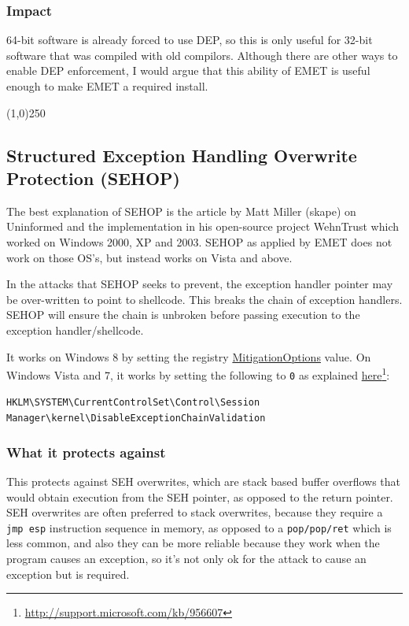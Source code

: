 \documentclass[]{article}
\newcommand{\fhref}[2]{\href{#1}{#2}\footnote{\url{#1}}}
\newcommand{\sectionbreakline}[0]{\begin{center}\line(1,0){250}\end{center}}
\begin{document}
\subsubsection{Impact}
64-bit software is already forced to use DEP, so this is only useful for
32-bit software that was compiled with old compilors.  Although there
are other ways to enable DEP enforcement, I would argue that this
ability of EMET is useful enough to make EMET a required install.


\sectionbreakline{}






\subsection{Structured Exception Handling Overwrite Protection (SEHOP)}\label{system_sehop}
The best explanation of SEHOP is the article by Matt Miller (skape) on Uninformed\cite{sehop_uninformed} and the implementation in
his open-source project WehnTrust\cite{wehntrust} which worked on Windows 2000,
XP and 2003. SEHOP as applied by EMET does not work on those OS's, but
instead works on Vista and above.

In the attacks that SEHOP seeks to prevent, the exception handler pointer may be over-written to point to shellcode. This breaks the chain of exception handlers.  SEHOP will ensure the chain is unbroken before passing execution to the exception handler/shellcode.

It works on Windows 8 by setting the registry
\hyperref[MitigationOptions]{MitigationOptions} value. On Windows Vista
and 7, it works by setting the following to \texttt{0} as explained \fhref{http://support.microsoft.com/kb/956607}{here}\cite{kb956607}:

\texttt{HKLM\textbackslash{}SYSTEM\textbackslash{}CurrentControlSet\textbackslash{}Control\textbackslash{}Session Manager\textbackslash{}kernel\textbackslash{}DisableExceptionChainValidation}



\subsubsection{What it protects against}
This protects against SEH overwrites, which are stack based buffer
overflows that would obtain execution from the SEH pointer, as opposed
to the return pointer. SEH overwrites are often preferred to stack
overwrites, because they require a \texttt{jmp esp} instruction sequence
in memory, as opposed to a \texttt{pop/pop/ret} which is less common,
and also they can be more reliable because they work when the program
causes an exception, so it's not only ok for the attack to cause an
exception but is required.
\end{document}
